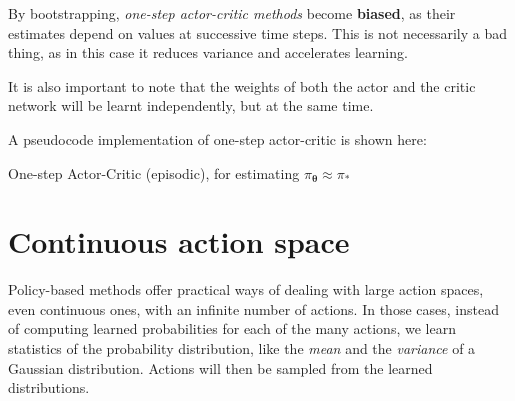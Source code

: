 By bootstrapping, \textit{one-step actor-critic methods} become \textbf{biased}, as their estimates depend on values at successive time steps. This is not necessarily a bad thing, as in this case it reduces variance and accelerates learning.

It is also important to note that the weights of both the actor and the critic network will be learnt independently, but at the same time.

A pseudocode implementation of one-step actor-critic is shown here:

\begin{algorithm}[H]
\DontPrintSemicolon
\SetAlgoVlined
{}

\caption{One-step Actor-Critic (episodic), for estimating $\pi_{\boldsymbol{\theta}} \approx \pi_*$}
\end{algorithm}

\section{Continuous action space}
Policy-based methods offer practical ways of dealing with large action spaces, even continuous ones, with an infinite number of actions. In those cases, instead of computing learned probabilities for each of the many actions, we learn statistics of the probability distribution, like the \textit{mean} and the \textit{variance} of a Gaussian distribution. Actions will then be sampled from the learned distributions.